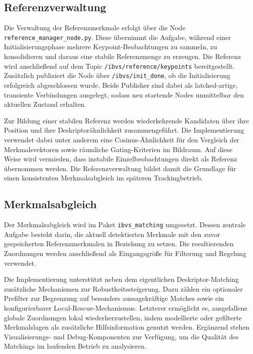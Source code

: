 \subsection{Referenzverwaltung}
\label{sec:implementierung_referenzverwaltung}

Die Verwaltung der Referenzmerkmale erfolgt über die Node \texttt{reference\_manager\_node.py}. Diese übernimmt die Aufgabe, während einer Initialisierungsphase mehrere Keypoint-Beobachtungen zu sammeln, zu konsolidieren und daraus eine stabile Referenzmenge zu erzeugen. Die Referenz wird anschließend auf dem Topic \texttt{/ibvs/reference/keypoints} bereitgestellt. Zusätzlich publiziert die Node über \texttt{/ibvs/init\_done}, ob die Initialisierung erfolgreich abgeschlossen wurde. Beide Publisher sind dabei als latched-artige, transiente Verbindungen ausgelegt, sodass neu startende Nodes unmittelbar den aktuellen Zustand erhalten. 

Zur Bildung einer stabilen Referenz werden wiederkehrende Kandidaten über ihre Position und ihre Deskriptorähnlichkeit zusammengeführt. Die Implementierung verwendet dabei unter anderem eine Cosinus-Ähnlichkeit für den Vergleich der Merkmalsvektoren sowie räumliche Gating-Kriterien im Bildraum. Auf diese Weise wird vermieden, dass instabile Einzelbeobachtungen direkt als Referenz übernommen werden. Die Referenzverwaltung bildet damit die Grundlage für einen konsistenten Merkmalsabgleich im späteren Trackingbetrieb.

\subsection{Merkmalsabgleich}
\label{sec:implementierung_merkmalsabgleich}

Der Merkmalsabgleich wird im Paket \texttt{ibvs\_matching} umgesetzt. Dessen zentrale Aufgabe besteht darin, die aktuell detektierten Merkmale mit den zuvor gespeicherten Referenzmerkmalen in Beziehung zu setzen. Die resultierenden Zuordnungen werden anschließend als Eingangsgröße für Filterung und Regelung verwendet.

Die Implementierung unterstützt neben dem eigentlichen Deskriptor-Matching zusätzliche Mechanismen zur Robustheitssteigerung. Dazu zählen ein optionaler Prefilter zur Begrenzung auf besonders aussagekräftige Matches sowie ein konfigurierbarer Local-Rescue-Mechanismus. Letzterer ermöglicht es, ausgefallene globale Zuordnungen lokal wiederherzustellen, indem modellierte oder gefilterte Merkmalslagen als zusätzliche Hilfsinformation genutzt werden. Ergänzend stehen Visualisierungs- und Debug-Komponenten zur Verfügung, um die Qualität des Matchings im laufenden Betrieb zu analysieren. 

